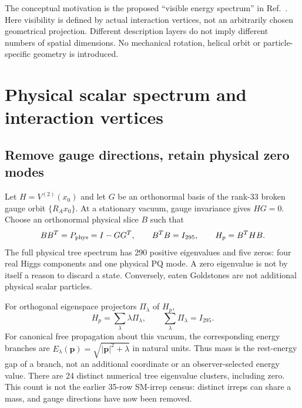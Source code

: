 \documentclass[11pt]{article}
\begin{document}
The conceptual motivation is the proposed ``visible energy spectrum''
in Ref.~\cite{chen}. Here visibility is defined by actual interaction
vertices, not an arbitrarily chosen geometrical projection. Different
description layers do not imply different numbers of spatial dimensions.
No mechanical rotation, helical orbit or particle-specific geometry is
introduced.

\section{Physical scalar spectrum and interaction vertices}
\subsection{Remove gauge directions, retain physical zero modes}
Let $H=V^{(2)}(x_0)$ and let $G$ be an orthonormal basis of the rank-33
broken gauge orbit $\{R_Ax_0\}$. At a stationary vacuum, gauge invariance
gives $HG=0$. Choose an orthonormal physical slice $B$ such that
\begin{equation}
 BB^T=P_{\rm phys}=I-GG^T,\qquad B^TB=I_{295},\qquad
 H_p=B^THB.
\end{equation}
The full physical tree spectrum has 290 positive eigenvalues and five
zeros: four real Higgs components and one physical PQ mode. A zero
eigenvalue is not by itself a reason to discard a state. Conversely,
eaten Goldstones are not additional physical scalar particles.

For orthogonal eigenspace projectors $\Pi_\lambda$ of $H_p$,
\begin{equation}
 H_p=\sum_\lambda\lambda\Pi_\lambda,\qquad
 \sum_\lambda\Pi_\lambda=I_{295}.
\end{equation}
For canonical free propagation about this vacuum, the corresponding
energy branches are $E_\lambda(\mathbf p)=\sqrt{|\mathbf p|^2+\lambda}$
in natural units. Thus mass is the rest-energy gap of a branch, not an
additional coordinate or an observer-selected energy value.
There are 24 distinct numerical tree eigenvalue clusters, including
zero. This count is not the earlier 35-row SM-irrep census: distinct
irreps can share a mass, and gauge directions have now been removed.
\end{document}
